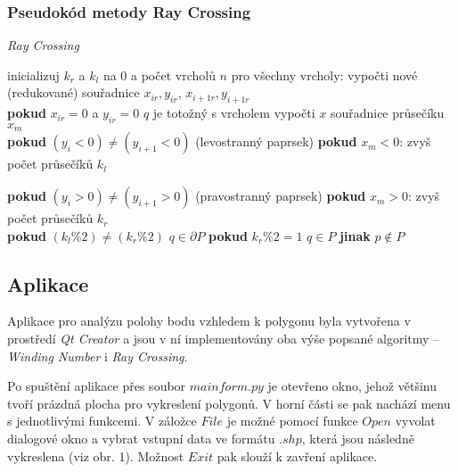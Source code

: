 \documentclass[15pt]{article}
\begin{document}
\begin{spacing}{1.5}
\subsubsection*{Pseudokód metody Ray Crossing}
\begin{algorithm}
    \caption {\textit{Ray Crossing}}
    \begin{algorithmic}[1]
        \State inicializuj $k_r$ a $k_l$ na 0 a počet vrcholů $n$
        \State pro všechny vrcholy:
        \State \indent vypočti nové (redukované) souřadnice $x_{ir}, y_{ir}$, $x_{i+1r}, y_{i+1r}$\\
        
        \State \indent \textbf{pokud} $x_{ir} = 0$ a $y_{ir} = 0$
        \State \indent \indent $q$ je totožný s vrcholem 
        \State \indent vypočti $x$ souřadnice průsečíku $x_m$ \\
        
        \State \indent \textbf{pokud} $(y_i < 0) \neq (y_{i+1}<0)$ (levostranný paprsek)
        \State \indent \indent \textbf{pokud} $x_m<0$:
        \State \indent \indent \indent zvyš počet průsečíků $k_l$

        \State \indent \textbf{pokud} $(y_i>0) \neq (y_{i+1}>0)$ (pravostranný paprsek) 
        \State \indent \indent \textbf{pokud} $x_m>0$:
        \State \indent \indent \indent  zvyš počet průsečíků $k_r$\\
        
        \State \textbf{pokud} $(k_l\%2) \neq (k_r\%2)$
        \State \indent $q \in \partial P$
        \State \textbf{pokud} $k_r\%2 = 1$
        \State  \indent $q \in P$
        \State \textbf{jinak} $p \notin P$
    \end{algorithmic}
\end{algorithm}

\subsection*{Aplikace}
Aplikace pro analýzu polohy bodu vzhledem k polygonu byla vytvořena v prostředí \textit{Qt Creator} a jsou v ní implementovány oba výše popsané algoritmy – \textit{Winding Number} i \textit{Ray Crossing}.

Po spuštění aplikace přes soubor $mainform.py$ je otevřeno okno, jehož většinu tvoří prázdná plocha pro vykreslení polygonů. V horní části se pak nachází menu s jednotlivými funkcemi. V záložce $File$  je možné pomocí funkce $Open$ vyvolat dialogové okno a vybrat vstupní data ve formátu $.shp$, která jsou následně vykreslena (viz obr. 1). Možnost $Exit$ pak slouží k zavření aplikace. 


\end{spacing}
\end{document}
